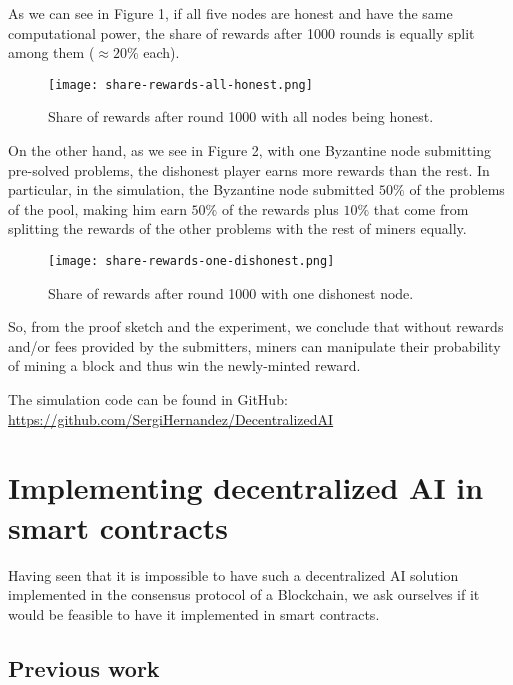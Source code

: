\documentclass[conference]{IEEEtran}
\begin{document}
As we can see in Figure 1, if all five nodes are honest and have the same computational power, the share of rewards after 1000 rounds is equally split among them ($\approx20\%$ each).

\begin{figure}[htbp]
\centerline{\texttt{[image: share-rewards-all-honest.png]}}
\caption{Share of rewards after round 1000 with all nodes being honest.}
\label{fig}
\end{figure}

On the other hand, as we see in Figure 2, with one Byzantine node submitting pre-solved problems, the dishonest player earns more rewards than the rest. In particular, in the simulation, the Byzantine node submitted $50\%$ of the problems of the pool, making him earn $50\%$ of the rewards plus $10\%$ that come from splitting the rewards of the other problems with the rest of miners equally.

\begin{figure}[htbp]
\centerline{\texttt{[image: share-rewards-one-dishonest.png]}}
\caption{Share of rewards after round 1000 with one dishonest node.}
\label{fig}
\end{figure}

So, from the proof sketch and the experiment, we conclude that without rewards and/or fees provided by the submitters, miners can manipulate their probability of mining a block and thus win the newly-minted reward.

The simulation code can be found in GitHub: \url{https://github.com/SergiHernandez/DecentralizedAI}

\section{Implementing decentralized AI in smart contracts}

Having seen that it is impossible to have such a decentralized AI solution implemented in the consensus protocol of a Blockchain, we ask ourselves if it would be feasible to have it implemented in smart contracts.

\subsection{Previous work}
\end{document}
